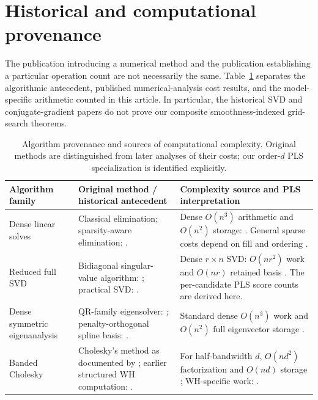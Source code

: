 \section{Historical and computational provenance}
\label{app:provenance}\label{sec:provenance}
The publication introducing a numerical method and the publication
establishing a particular operation count are not necessarily the
same. Table~\ref{tab:provenance} separates the algorithmic
antecedent, published numerical-analysis cost results, and the
model-specific arithmetic counted in this article. In particular,
the historical SVD and conjugate-gradient papers do not prove
our composite smoothness-indexed grid-search theorems.

\begin{table}
\centering
{\CSDAlocalcaptionstyle \caption{Algorithm provenance and sources of computational complexity.
Original methods are distinguished from later analyses of their costs;
our order-$d$ PLS specialization is identified explicitly.}\label{tab:provenance}}
\setlength{\tabcolsep}{8pt}
\renewcommand{\arraystretch}{1.30}
\normalsize
\begin{tabularx}{0.94\textheight}{@{}p{0.18\textheight}p{0.31\textheight}X@{}}
\toprule
\textbf{Algorithm family} & \textbf{Original method / historical antecedent}
& \textbf{Complexity source and PLS interpretation}\\
\midrule
Dense linear solves &
Classical elimination; sparsity-aware elimination:
\citet{markowitz1957}. &
Dense $O(n^3)$ arithmetic and $O(n^2)$ storage:
\citet{golubvanloan2013}. General sparse costs depend
on fill and ordering \citep{davis2006}.\\
\addlinespace
Reduced full SVD &
Bidiagonal singular-value algorithm:
\citet{golubkahan1965};
practical SVD: \citet{golubreinsch1970}. &
Dense $r\times n$ SVD: $O(nr^2)$ work and
$O(nr)$ retained basis \citep{golubvanloan2013}.
The per-candidate PLS score counts are derived here.\\
\addlinespace
Dense symmetric eigenanalysis &
QR-family eigensolver: \citet{francis1961};
penalty-orthogonal spline basis: \citet{demmler1975}. &
Standard dense $O(n^3)$ work and
$O(n^2)$ full eigenvector storage
\citep{golubvanloan2013}.\\
\addlinespace
Banded Cholesky &
Cholesky's method as documented by
\citet{benoit1924}; earlier structured
WH computation: \citet{henderson1925}. &
For half-bandwidth $d$, $O(nd^2)$
factorization and $O(nd)$ storage
\citep{golubvanloan2013,anderson1999};
WH-specific work: \citet{weinert2007}.\\

\end{tabularx}
\end{table}
